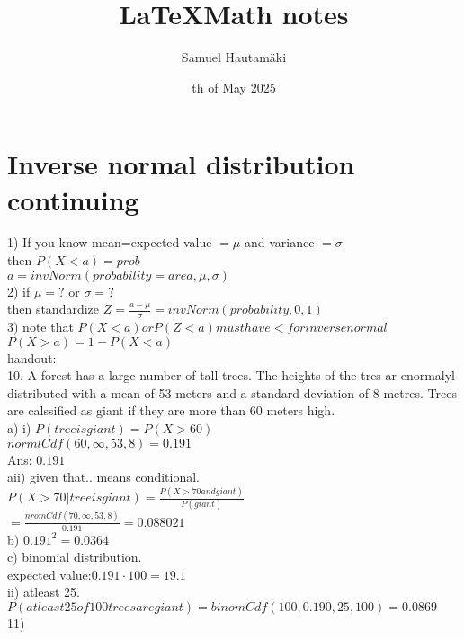 \documentclass{article}
\title{\LaTeX Math notes}
\author{Samuel Hautamäki}
\date{th of May 2025}
\begin{document}
  \maketitle
   
  \section{Inverse normal distribution continuing}
  1) If you know mean=expected value $=\mu$ and variance $=\sigma$\\
  then $P(X<a)=prob$\\
  $a=invNorm(probability=area,\mu,\sigma)$\\
  2) if $\mu=?$ or $\sigma=?$\\
  then standardize $Z=\frac{a-\mu}{\sigma}=invNorm(probability,0,1)$\\
  3) note that $P(X<a) or P(Z<a) must have < for inverse normal$\\
  $P(X>a)=1-P(X<a)$\\
  handout:\\
  10. A forest has a large number of tall trees. The heights of the tres ar enormalyl distributed with a mean of 53 meters and a standard deviation of 8 metres. Trees are calssified as giant if they are more than 60 meters high.\\
  a) i) $P(tree is giant)=P(X>60)$\\
  $normlCdf(60,\infty,53,8)=0.191$\\
  Ans: $0.191$\\
  aii) given that.. means conditional.\\
  $P(X>70 | tree is giant)=\frac{P(X>70 and giant)}{P(giant)}$\\
  $=\frac{nromCdf(70,\infty,53,8)}{0.191}=0.088021$\\
  b) $0.191^2=0.0364$\\
  c) binomial distribution.\\
  expected value:$0.191\cdot100=19.1$\\
  ii) atleast 25.\\
  $P(atleast 25 of 100 trees are giant)=binomCdf(100,0.190,25,100)=0.0869$\\
  11) 
  

  
   

   
\end{document}
